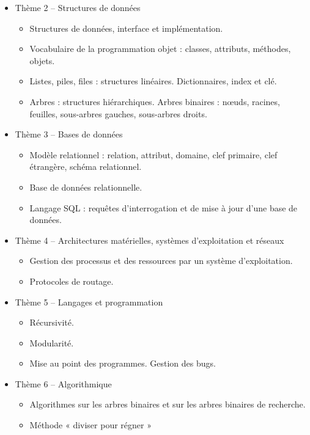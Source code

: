 \documentclass[
  letterpaper,
  DIV=11,
  numbers=noendperiod]{scrartcl}
\providecommand{\tightlist}{%
  \setlength{\itemsep}{0pt}\setlength{\parskip}{0pt}}\usepackage{longtable,booktabs,array}
\begin{document}
\begin{itemize}
\item
  Thème 2 -- Structures de données

  \begin{itemize}
  \tightlist
  \item
    Structures de données, interface et implémentation.
  \item
    Vocabulaire de la programmation objet : classes, attributs,
    méthodes, objets.
  \item
    Listes, piles, files : structures linéaires. Dictionnaires, index et
    clé.
  \item
    Arbres : structures hiérarchiques. Arbres binaires : nœuds, racines,
    feuilles, sous-arbres gauches, sous-arbres droits.
  \end{itemize}
\item
  Thème 3 -- Bases de données

  \begin{itemize}
  \tightlist
  \item
    Modèle relationnel : relation, attribut, domaine, clef primaire,
    clef étrangère, schéma relationnel.
  \item
    Base de données relationnelle.
  \item
    Langage SQL : requêtes d'interrogation et de mise à jour d'une base
    de données.
  \end{itemize}
\item
  Thème 4 -- Architectures matérielles, systèmes d'exploitation et
  réseaux

  \begin{itemize}
  \tightlist
  \item
    Gestion des processus et des ressources par un système
    d'exploitation.
  \item
    Protocoles de routage.
  \end{itemize}
\item
  Thème 5 -- Langages et programmation

  \begin{itemize}
  \tightlist
  \item
    Récursivité.
  \item
    Modularité.
  \item
    Mise au point des programmes. Gestion des bugs.
  \end{itemize}
\item
  Thème 6 -- Algorithmique

  \begin{itemize}
  \tightlist
  \item
    Algorithmes sur les arbres binaires et sur les arbres binaires de
    recherche.
  \item
    Méthode « diviser pour régner »
  \end{itemize}
\end{itemize}
\end{document}
